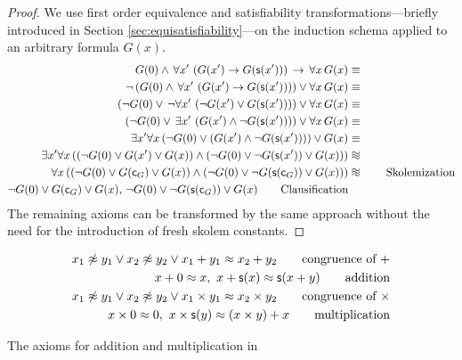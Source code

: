 \begin{proof}
We use first order equivalence and satisfiability transformations---briefly introduced 
in Section \ref{sec:equisatisfiability}---on the induction schema 
applied to an arbitrary formula \( G(x) \).
\begin{align*}
	G(0) \land  \, \forall x'\, \left(G(x') \limp G(\msucc(x'))\right)
\, \limp \, \forall x \, G(x)
&\equiv\\
\lnot\left(
	G(0) \land  \, \forall x'\, \left(G(x') \limp G(\msucc(x'))\right)
\right)
\lor \forall x \, G(x)
&\equiv\\
\left(
	\lnot G(0) \lor  \, \lnot\forall x'\, \left(\lnot G(x') \lor G(\msucc(x'))\right)
\right)
\lor \forall x \, G(x)
&\equiv\\
\left(
	\lnot G(0) \lor  \, \exists x'\, \left(G(x') \land \lnot G(\msucc(x'))\right)
\right)
\lor \forall x \, G(x)
&\equiv\\
\exists x' \forall x
\left(
	\lnot G(0) \lor \left(G(x') \land \lnot G(\msucc(x'))\right)
\right)
\lor G(x)
&\equiv\\
\exists x' \forall x
\left(
	(\lnot G(0) \lor G(x') \lor G(x))
	\land
	(\lnot G(0) \lor \lnot G(\msucc(x')) \lor G(x))
\right)
&\equisat\\
\forall x
\left(
	(\lnot G(0) \lor G(\mc_G) \lor G(x))
	\land
	(\lnot G(0) \lor \lnot G(\msucc(\mc_G)) \lor G(x))
\right)
&\equisat\tag*{Skolemization}\\
\lnot G(0) \lor G(\mc_G) \lor G(x),\,
	\lnot G(0) \lor \lnot G(\msucc(\mc_G)) \lor G(x)
	\tag*{Clausification}
\end{align*}
The remaining axioms can be transformed by the same approach without the need for the introduction of fresh skolem constants.
\end{proof}

\begin{table}[hbt]
	\begin{align*}
		x_1\not\approx y_1\lor x_2\not\approx y_2\lor x_1+y_1 \approx x_2+y_2
		\tag*{congruence of \( + \)}
		\\
		x + 0 \approx x,\
		x+\mathsf{s}(x) \approx \mathsf{s}(x+y)
		\tag*{addition}
		\\
		x_1\not\approx y_1\lor x_2\not\approx y_2\lor x_1\times y_1 \approx x_2\times y_2
		\tag*{congruence of \( \times \)}
		\\
		x \times 0 \approx 0,\
		x \times\mathsf{s}(y) \approx (x\times y) + x
		\tag*{multiplication}
	\end{align*}
	\caption{The axioms for addition and multiplication in \CNF}\label{tab:addition:multiplication}
\end{table}

